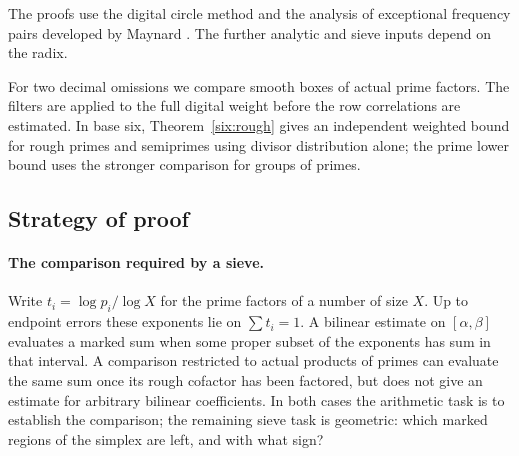 \documentclass[11pt,a4paper]{article}
\theoremstyle{paperplain}
\numberwithin{equation}{section}
\begin{document}
The proofs use the digital circle method and the analysis of
exceptional frequency pairs developed by Maynard
\cite[Sections~10 and~13--15]{Maynard2019}. The further analytic and sieve inputs depend on the radix.

For two decimal omissions we compare smooth boxes of actual prime factors. The filters are applied to the full
digital weight before the row correlations are estimated. In base six,
Theorem~\ref{six:rough} gives an independent weighted bound for
rough primes and semiprimes using divisor distribution alone; the
prime lower bound uses the stronger comparison for groups of primes.

\subsection{Strategy of proof}\label{sec:outline}

\paragraph{The comparison required by a sieve.}
Write $t_i=\log p_i/\log X$ for the prime factors of a number of size
$X$. Up to endpoint errors these exponents lie on $\sum t_i=1$.
A bilinear estimate on $[\alpha,\beta]$ evaluates a marked sum when some
proper subset of the exponents has sum in that interval. A comparison
restricted to actual products of primes can evaluate the same sum once
its rough cofactor has been factored, but does not give an estimate for
arbitrary bilinear coefficients. In both cases the arithmetic task is
to establish the comparison; the remaining sieve task is geometric:
which marked regions of the simplex are left, and with what sign?
\end{document}
